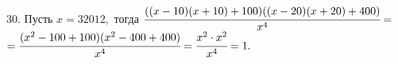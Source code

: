 30. Пусть $x=32012,$ тогда $\cfrac{((x-10)(x+10)+100)((x-20)(x+20)+400)}{x^4}=$\\$=\cfrac{(x^2-100+100)(x^2-400+400)}{x^4}=
\cfrac{x^2\cdot x^2 }{x^4}=1.$\\

